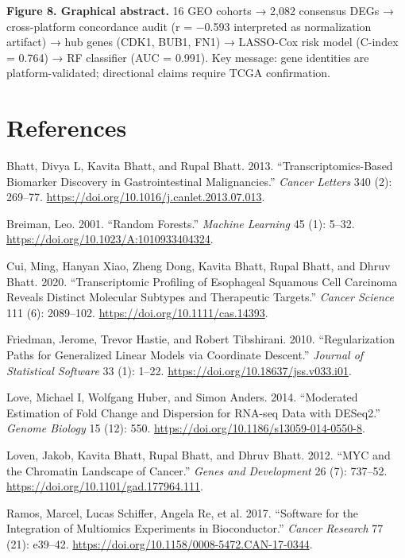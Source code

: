 \documentclass[
  12pt,
]{article}
\newlength{\cslhangindent}
\newenvironment{CSLReferences}[2] %
 {\begin{list}{}{%
  \setlength{\itemindent}{0pt}
  \setlength{\leftmargin}{0pt}
  \setlength{\parsep}{0pt}
  \ifodd #1
   \setlength{\leftmargin}{\cslhangindent}
   \setlength{\itemindent}{-1\cslhangindent}
  \fi
  \setlength{\itemsep}{#2\baselineskip}}}
 {\end{list}}
\begin{document}
\textbf{Figure 8. Graphical abstract.} 16 GEO cohorts → 2,082 consensus
DEGs → cross-platform concordance audit (r = −0.593 interpreted as
normalization artifact) → hub genes (CDK1, BUB1, FN1) → LASSO-Cox risk
model (C-index = 0.764) → RF classifier (AUC = 0.991). Key message: gene
identities are platform-validated; directional claims require TCGA
confirmation.

\section{References}\label{references}

\protect{}\label{refs}
\begin{CSLReferences}{1}{1}
Bhatt, Divya L, Kavita Bhatt, and Rupal Bhatt. 2013.
{``Transcriptomics-Based Biomarker Discovery in Gastrointestinal
Malignancies.''} \emph{Cancer Letters} 340 (2): 269--77.
\url{https://doi.org/10.1016/j.canlet.2013.07.013}.

Breiman, Leo. 2001. {``Random Forests.''} \emph{Machine Learning} 45
(1): 5--32. \url{https://doi.org/10.1023/A:1010933404324}.

Cui, Ming, Hanyan Xiao, Zheng Dong, Kavita Bhatt, Rupal Bhatt, and Dhruv
Bhatt. 2020. {``Transcriptomic Profiling of Esophageal Squamous Cell
Carcinoma Reveals Distinct Molecular Subtypes and Therapeutic
Targets.''} \emph{Cancer Science} 111 (6): 2089--102.
\url{https://doi.org/10.1111/cas.14393}.

Friedman, Jerome, Trevor Hastie, and Robert Tibshirani. 2010.
{``Regularization Paths for Generalized Linear Models via Coordinate
Descent.''} \emph{Journal of Statistical Software} 33 (1): 1--22.
\url{https://doi.org/10.18637/jss.v033.i01}.

Love, Michael I, Wolfgang Huber, and Simon Anders. 2014. {``Moderated
Estimation of Fold Change and Dispersion for {RNA-seq} Data with
{DESeq2}.''} \emph{Genome Biology} 15 (12): 550.
\url{https://doi.org/10.1186/s13059-014-0550-8}.

Loven, Jakob, Kavita Bhatt, Rupal Bhatt, and Dhruv Bhatt. 2012. {``{MYC}
and the Chromatin Landscape of Cancer.''} \emph{Genes and Development}
26 (7): 737--52. \url{https://doi.org/10.1101/gad.177964.111}.

Ramos, Marcel, Lucas Schiffer, Angela Re, et al. 2017. {``Software for
the Integration of Multiomics Experiments in {Bioconductor}.''}
\emph{Cancer Research} 77 (21): e39--42.
\url{https://doi.org/10.1158/0008-5472.CAN-17-0344}.


\end{CSLReferences}
\end{document}
